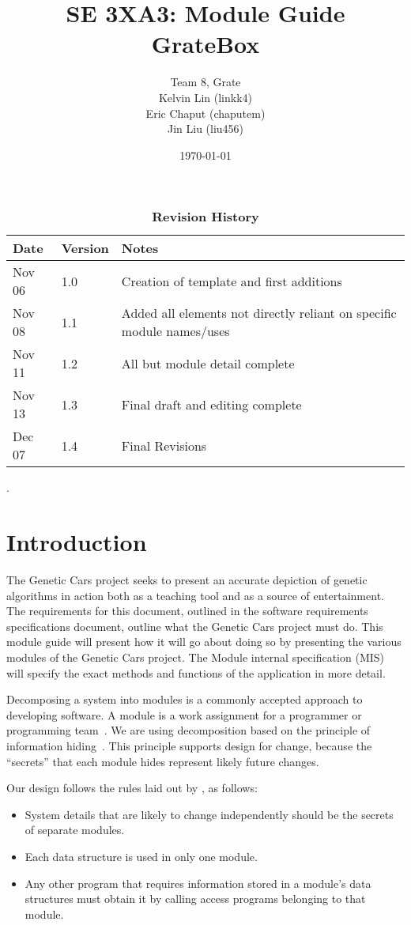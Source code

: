 \documentclass[12pt, titlepage]{article}
\title{SE 3XA3: Module Guide\\GrateBox}
\author{Team 8, Grate
		\\ Kelvin Lin (linkk4)
		\\ Eric Chaput (chaputem)
		\\ Jin Liu (liu456)
}
\date{\today}
\begin{document}
\maketitle

\tableofcontents
\listoftables
\begin{table}[h]
\caption{\bf Revision History}
\begin{tabularx}{\textwidth}{p{3cm}p{2cm}X}
\toprule {\bf Date} & {\bf Version} & {\bf Notes}\\
\midrule
Nov 06 & 1.0 & Creation of template and first additions\\
Nov 08 & 1.1 & Added all elements not directly reliant on specific module 
names/uses\\
Nov 11 & 1.2 & All but module detail complete\\
Nov 13 & 1.3 & Final draft and editing complete\\
Dec 07 & 1.4 & Final Revisions\\
\bottomrule
\end{tabularx}
\end{table}
\newpage
.
\newpage

\section{Introduction}

The Genetic Cars project seeks to present an accurate depiction of genetic 
algorithms in action both as a teaching tool and as a source of entertainment. 
The requirements for this document, outlined in the software requirements 
specifications document, outline what the Genetic Cars project must do. This 
module guide will present how it will go about doing so by presenting the 
various modules of the Genetic Cars project. The Module internal specification 
(MIS) will specify the exact methods and functions of the application in more 
detail.

Decomposing a system into modules is a commonly accepted approach to developing
software.  A module is a work assignment for a programmer or programming
team~\citep{ParnasEtAl1984}.  We are using decomposition
based on the principle of information hiding~\citep{Parnas1972a}.  This
principle supports design for change, because the ``secrets'' that each module
hides represent likely future changes.  

Our design follows the rules laid out by \citet{ParnasEtAl1984}, as follows:
\begin{itemize}
\item System details that are likely to change independently should be the
  secrets of separate modules.
\item Each data structure is used in only one module.
\item Any other program that requires information stored in a module's data
  structures must obtain it by calling access programs belonging to that module.
\end{itemize}
\end{document}
